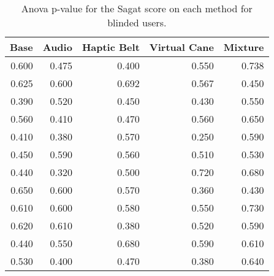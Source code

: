 
\begin{table}[!htb]
\centering
\caption{Anova p-value for the Sagat score on each method for blinded users.}
\label{tab:anova_sagat}
\begin{tabular}{rrrrr}
\toprule
 Base &  Audio &  Haptic Belt &  Virtual Cane &  Mixture \\
\midrule
0.600 &  0.475 &        0.400 &         0.550 &    0.738 \\
0.625 &  0.600 &        0.692 &         0.567 &    0.450 \\
0.390 &  0.520 &        0.450 &         0.430 &    0.550 \\
0.560 &  0.410 &        0.470 &         0.560 &    0.650 \\
0.410 &  0.380 &        0.570 &         0.250 &    0.590 \\
0.450 &  0.590 &        0.560 &         0.510 &    0.530 \\
0.440 &  0.320 &        0.500 &         0.720 &    0.680 \\
0.650 &  0.600 &        0.570 &         0.360 &    0.430 \\
0.610 &  0.600 &        0.580 &         0.550 &    0.730 \\
0.620 &  0.610 &        0.380 &         0.520 &    0.590 \\
0.440 &  0.550 &        0.680 &         0.590 &    0.610 \\
0.530 &  0.400 &        0.470 &         0.380 &    0.640 \\
\bottomrule
\end{tabular}
\end{table}


